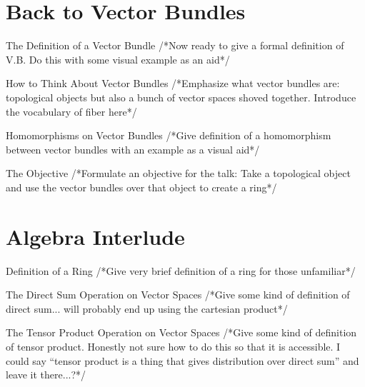 \documentclass[12pt]{beamer}
\newcommand{\toadd}[1]{/*#1*/}
\begin{document}
\section{Back to Vector Bundles}

\begin{frame}{The Definition of a Vector Bundle}
	\toadd{Now ready to give a formal definition of V.B. Do this with some visual example as an aid}
\end{frame}

\begin{frame}{How to Think About Vector Bundles}
	\toadd{Emphasize what vector bundles are: topological objects but also a bunch of vector spaces shoved together. Introduce the vocabulary of fiber here}
\end{frame}

\begin{frame}{Homomorphisms on Vector Bundles}
	\toadd{Give definition of a homomorphism between vector bundles with an example as a visual aid}
\end{frame}

\begin{frame}{The Objective}
	\toadd{Formulate an objective for the talk: Take a topological object and use the vector bundles over that object to create a ring}
\end{frame}

\section{Algebra Interlude}

\begin{frame}{Definition of a Ring}
	\toadd{Give very brief definition of a ring for those unfamiliar}
\end{frame}


\begin{frame}{The Direct Sum Operation on Vector Spaces}
	\toadd{Give some kind of definition of direct sum... will probably end up using the cartesian product}
\end{frame}

\begin{frame}{The Tensor Product Operation on Vector Spaces}
	\toadd{Give some kind of definition of tensor product. Honestly not sure how to do this so that it is accessible. I could say ``tensor product is a thing that gives distribution over direct sum'' and leave it there...?}
\end{frame}
\end{document}
